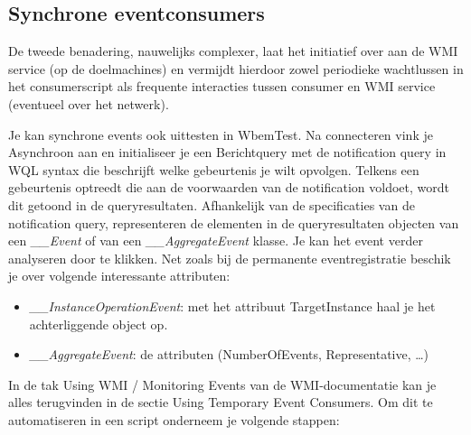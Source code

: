 \documentclass[11pt,a4paper]{report}
\begin{document}
\subsection{Synchrone eventconsumers}
De tweede benadering, nauwelijks complexer, laat het initiatief over aan de WMI service (op de doelmachines) en vermijdt hierdoor zowel periodieke wachtlussen in het consumerscript als frequente interacties tussen consumer en WMI service (eventueel over het netwerk).
\par Je kan synchrone events ook uittesten in WbemTest. Na connecteren vink je Asynchroon aan en initialiseer je een Berichtquery met de notification query in WQL syntax die beschrijft welke gebeurtenis je wilt opvolgen. Telkens een gebeurtenis optreedt die aan de voorwaarden van de notification voldoet, wordt dit getoond in de queryresultaten. Afhankelijk van de specificaties van de notification query, representeren de elementen in de queryresultaten objecten van een \textit{\_\_Event} of van een \textit{\_\_AggregateEvent} klasse. Je kan het event verder analyseren door te klikken. Net zoals bij de permanente eventregistratie beschik je over volgende interessante attributen:
\begin{itemize}
	\item \textit{\_\_InstanceOperationEvent}: met het attribuut TargetInstance haal je het achterliggende object op.
	\item \textit{\_\_AggregateEvent}: de attributen (NumberOfEvents, Representative, …)
\end{itemize}
In de tak Using WMI / Monitoring Events van de WMI-documentatie kan je alles terugvinden in de sectie Using Temporary Event Consumers. Om dit te automatiseren in een script onderneem je volgende stappen:
\end{document}
